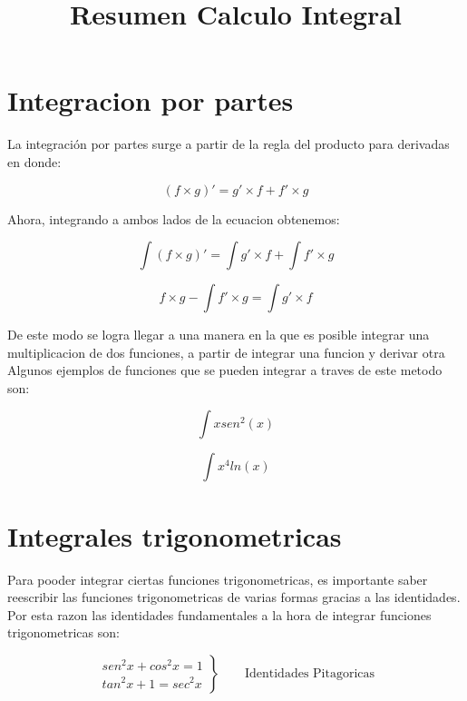 \documentclass{article}
\title{Resumen Calculo Integral}
\begin{document}
\date{}
\maketitle
 

\section{Integracion por partes}
 
La integración por partes surge a partir de la regla del producto para derivadas en donde:
 
\begin{equation}
(f\times{g})'=g'\times{f} + f'\times{g}
\end{equation}
 
Ahora, integrando a ambos lados de la ecuacion obtenemos:
 
\begin{equation}
\int{(f\times{g})'}=\int{g'\times{f}} + \int{f'\times{g}}
\end{equation}
 
\begin{equation}
f\times{g} -  \int{f'\times{g}} =\int{g'\times{f}}
\end{equation}
 
De este modo se logra llegar a una manera en la que es posible integrar una multiplicacion de dos funciones, a partir de integrar una funcion y derivar otra\\
 
Algunos ejemplos de funciones que se pueden integrar a traves de este metodo son:
 
\begin{equation}
\int{xsen^2(x)}
\end{equation}
 
\begin{equation}
\int{x^4ln(x)}
\end{equation}
 
\section{Integrales trigonometricas}
 
Para pooder integrar ciertas funciones trigonometricas, es importante saber reescribir las funciones trigonometricas de varias formas gracias a las identidades. Por esta razon las identidades fundamentales a la hora de integrar funciones trigonometricas son:
 
\begin{equation}
\left.\begin{aligned}       
sen^2x+cos^2x=1\\
tan^2x+1=sec^2x
\end{aligned}
\right\}
\qquad \text{Identidades Pitagoricas}
\end{equation}\\
 
\end{document}
